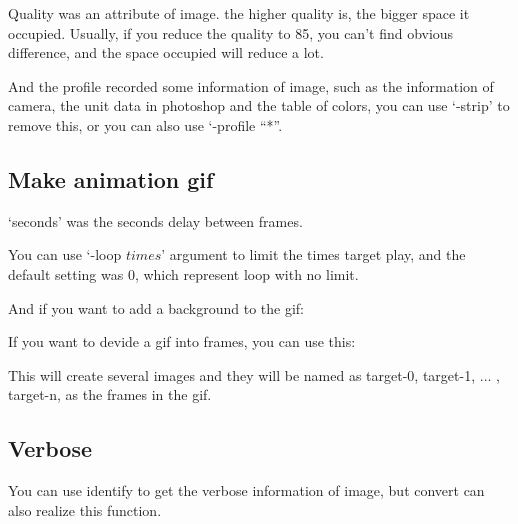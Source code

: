 \documentclass[12pt]{article}
\begin{document}
Quality was an attribute of image. the higher quality is, the bigger space it occupied. Usually, if you reduce the quality to 85, you can't find obvious difference, and the space occupied will reduce a lot.

And the profile recorded some information of image, such as the information of camera, the unit data in photoshop and the table of colors, you can use `-strip' to remove this, or you can also use `-profile ``*''.

\subsection{Make animation gif}
{\centering{}\par}\vspace{5mm}

`seconds' was the seconds delay between frames.

You can use `-loop $times$' argument to limit the times target play, and the default setting was 0, which represent loop with no limit.

And if you want to add a background to the gif:\vspace{5mm}

{\centering{}\par} \vspace{5mm}

If you want to devide a gif into frames, you can use this:\vspace{5mm}

{\centering{}\par}\vspace{5mm}

This will create several images and they will be named as target-0, target-1, $\dots$ , target-n, as the frames in the gif.

\subsection{Verbose}

You can use identify to get the verbose information of image, but convert can also realize this function.\vspace{5mm}

{\centering{}\par}\vspace{5mm}
\end{document}
